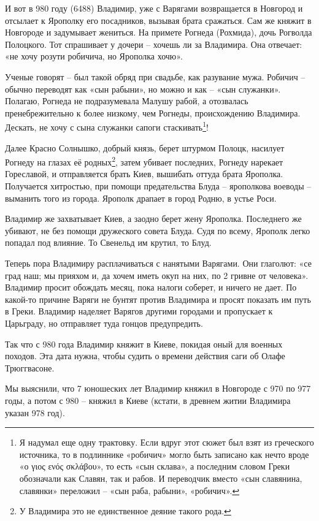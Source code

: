 И вот в 980 году (6488) Владимир, уже с Варягами возвращается в Новгород и отсылает к Ярополку его посадников, вызывая брата сражаться. Сам же княжит в Новгороде и задумывает жениться. На примете Рогнеда (Рохмида), дочь Рогволда Полоцкого. Тот спрашивает у дочери – хочешь ли за Владимира. Она отвечает: «не хочу розути робичича, но Ярополка хочю».

Ученые говорят – был такой обряд при свадьбе, как разувание мужа. Робичич – обычно переводят как «сын рабыни», но можно и как – «сын служанки». Полагаю, Рогнеда не подразумевала Малушу рабой, а отозвалась пренебрежительно к более низкому, чем Рогнеды, происхождению Владимира. Дескать, не хочу с сына служанки сапоги стаскивать\footnote{Я надумал еще одну трактовку. Если вдруг этот сюжет был взят из греческого источника, то в подлиннике «робичич» могло быть записано как нечто вроде «ο γιος ενός σκλάβου», то есть «сын склава», а последним словом Греки обозначали как Славян, так и рабов. И переводчик вместо «сын славянина, славянки» переложил – «сын раба, рабыни», «робичич».}!

Далее Красно Солнышко, добрый князь, берет штурмом Полоцк, насилует Рогнеду на глазах её родных\footnote{У Владимира это не единственное деяние такого рода.}, затем убивает последних, Рогнеду нарекает Гореславой, и отправляется брать Киев, вышибать оттуда брата Ярополка. Получается хитростью, при помощи предательства Блуда – ярополкова воеводы – выманить того из города. Ярополк драпает в город Родню, в устье Роси.

Владимир же захватывает Киев, а заодно берет жену Ярополка. Последнего же убивают, не без помощи дружеского совета Блуда. Судя по всему, Ярополк легко попадал под влияние. То Свенельд им крутил, то Блуд.

Теперь пора Владимиру расплачиваться с нанятыми Варягами. Они глаголют: «се град наш; мы прияхом и, да хочем иметь окуп на них, по 2 гривне от человека». Владимир просит обождать месяц, пока налоги соберет, и ничего не дает. По какой-то причине Варяги не бунтят против Владимира и просят показать им путь в Греки. Владимир наделяет Варягов другими городами и пропускает к Царьграду, но отправляет туда гонцов предупредить.

Так что с 980 года Владимир княжит в Киеве, покидая оный для военных походов. Эта дата нужна, чтобы судить о времени действия саги об Олафе Трюггвасоне.

Мы выяснили, что 7 юношеских лет Владимир княжил в Новгороде с 970 по 977 годы, а потом с 980 – княжил в Киеве (кстати, в древнем житии Владимира указан 978 год).

